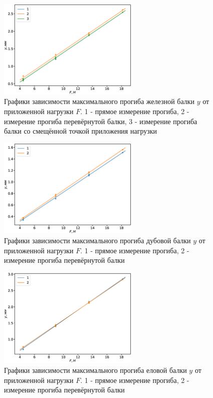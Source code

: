 \documentclass[12pt]{article}
\begin{document}
\begin{figure}[H]
    \begin{center}
        \includegraphics[width=0.6\textwidth]{gr1.eps}
    \end{center}
    \caption{Графики зависимости максимального прогиба железной балки $y$ от приложенной нагрузки $F$. 1 - прямое измерение прогиба,
        2 - измерение прогиба перевёрнутой балки, 3 - измерение прогиба балки со смещённой точкой приложения нагрузки}
    \label{fig:5}
\end{figure}

\begin{figure}[H]
    \begin{center}
        \includegraphics[width=0.6\textwidth]{gr2.eps}
    \end{center}
    \caption{Графики зависимости максимального прогиба дубовой балки $y$ от приложенной нагрузки $F$. 1 - прямое измерение прогиба,
        2 - измерение прогиба перевёрнутой балки}
    \label{fig:6}
\end{figure}

\begin{figure}[H]
    \begin{center}
        \includegraphics[width=0.6\textwidth]{gr3.eps}
    \end{center}
    \caption{Графики зависимости максимального прогиба еловой балки $y$ от приложенной нагрузки $F$. 1 - прямое измерение прогиба,
        2 - измерение прогиба перевёрнутой балки}
    \label{fig:7}
\end{figure}
\end{document}
